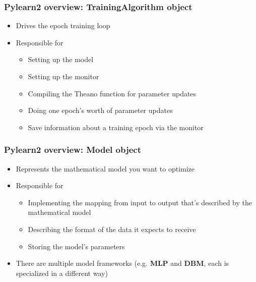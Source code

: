 \documentclass[mathserif, xcolor=dvipsnames]{beamer}
\begin{document}
\begin{frame}
    \frametitle{Pylearn2 overview: \textbf{TrainingAlgorithm} object}
    \Large
    \begin{itemize}\addtolength{\itemsep}{1.0\baselineskip}
        \item{Drives the epoch training loop}
        \item{
            Responsible for
            \begin{itemize}\addtolength{\itemsep}{0.5\baselineskip}
                \large
                \item{Setting up the model}
                \item{Setting up the monitor}
                \item{Compiling the Theano function for parameter updates}
                \item{Doing one epoch's worth of parameter updates}
                \item{Save information about a training epoch via the monitor}
            \end{itemize}
        }
    \end{itemize}

\end{frame}

\begin{frame}
    \frametitle{Pylearn2 overview: \textbf{Model} object}
    \Large
    \begin{itemize}\addtolength{\itemsep}{1.0\baselineskip}
        \item{Represents the mathematical model you want to optimize}
        \item{
            Responsible for
            \begin{itemize}\addtolength{\itemsep}{0.5\baselineskip}
                \large
                \item{Implementing the mapping from input to output that's
                      described by the mathematical model}
                \item{Describing the format of the data it expects to receive}
                \item{Storing the model's parameters}
            \end{itemize}
        }
        \item{There are multiple model frameworks (e.g. \textbf{MLP} and
              \textbf{DBM}, each is specialized in a different way)}
    \end{itemize}

\end{frame}
\end{document}
